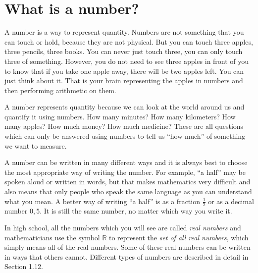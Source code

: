     \section{What is a number?}
            \nopagebreak
      \label{m38346*id171500}A number is a way to represent quantity. Numbers are not something that you can touch or hold, because they are not physical. But you can touch three apples, three pencils, three books. You can never just touch three, you can only touch three of something. However, you do not need to see three apples in front of you to know that if you take one apple away, there will be two apples left. You can just think about it. That is your brain representing the apples in numbers and then performing arithmetic on them.\par 
      \label{m38346*id171507}A number represents quantity because we can look at the world around us and
quantify it using numbers. How many minutes? How many kilometers? How
many apples? How much money? How much medicine? These are all questions which can only be answered using numbers to tell us ``how much'' of something we want to measure.\par 
      \label{m38346*id171516}A number can be written in many different ways and it is always best to choose the most appropriate way of writing the number. For example, ``a half'' may be spoken aloud or written in words, but that makes mathematics very difficult and also means that only people who speak the same language as you can understand what you mean. A better way of writing ``a half'' is as a fraction $\frac{1}{2}$ or as a decimal number $0,5$. It is still the same number, no matter which way you write it.\par 
      \label{m38346*id171551}In high school, all the numbers which you will see are called \textsl{real
numbers} and mathematicians use the symbol $\mathbb{R}$ to represent the \textsl{set of all real numbers}, which simply means all of the real numbers. Some of these real numbers can be written in ways that others cannot. Different types of numbers are described in detail in Section 1.12.\par 
